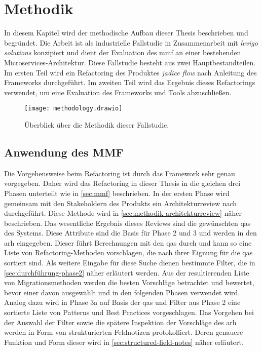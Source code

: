 \chapter{Methodik}
\label{chap:methodik}

In diesem Kapitel wird der methodische Aufbau dieser Thesis beschrieben und begründet.
Die Arbeit ist als industrielle Fallstudie in Zusammenarbeit mit \emph{levigo solutions} konzipiert und dient der Evaluation des \gls{mmf} an einer bestehenden Microservices-Architektur.
Diese Fallstudie besteht aus zwei Hauptbestandteilen.
Im ersten Teil wird ein Refactoring des Produktes \emph{jadice flow} nach Anleitung des Frameworks durchgeführt.
Im zweiten Teil wird das Ergebnis dieses Refactorings verwendet, um eine Evaluation des Frameworks und Tools abzuschließen.

\begin{figure}[!ht]
	\centering
	\texttt{[image: methodology.drawio]}
	\caption[Überblick über die Methodik dieser Fallstudie]{
		Überblick über die Methodik dieser Fallstudie.
	}
	\label{fig:methodology}
\end{figure}

\section{Anwendung des MMF}

Die Vorgehensweise beim Refactoring ist durch das Framework sehr genau vorgegeben.
Daher wird das Refactoring in dieser Thesis in die gleichen drei Phasen unterteilt wie in \cref{sec:mmf} beschrieben.
In der ersten Phase wird gemeinsam mit den Stakeholdern des Produkts ein Architekturreview nach  durchgeführt.
Diese Methode wird in \cref{sec:methodik-architekturreview} näher beschrieben.
Das wesentliche Ergebnis dieses Reviews sind die gewünschten \glspl{qa} des Systems.
Diese Attribute sind die Basis für Phase 2 und 3 und werden in den \gls{arh} eingegeben.
Dieser führt Berechnungen mit den \glspl{qa} durch und kann so eine Liste von Refactoring-Methoden vorschlagen, die nach ihrer Eignung für die \glspl{qa} sortiert sind.
Als weitere Eingabe für diese Suche dienen bestimmte Filter, die in \cref{sec:durchführung-phase2} näher erläutert werden.
Aus der resultierenden Liste von Migrationsmethoden werden die besten Vorschläge betrachtet und bewertet, bevor einer davon ausgewählt und in den folgenden Phasen verwendet wird.
Analog dazu wird in Phase 3a auf Basis der \glspl{qa} und Filter aus Phase 2 eine sortierte Liste von Patterns und Best Practices vorgeschlagen.
Das Vorgehen bei der Auswahl der Filter sowie die spätere Inspektion der Vorschläge des \gls{arh} werden in Form von strukturierten Feldnotizen protokolliert.
Deren genauere Funktion und Form dieser wird in \cref{sec:structured-field-notes} näher erläutert.

